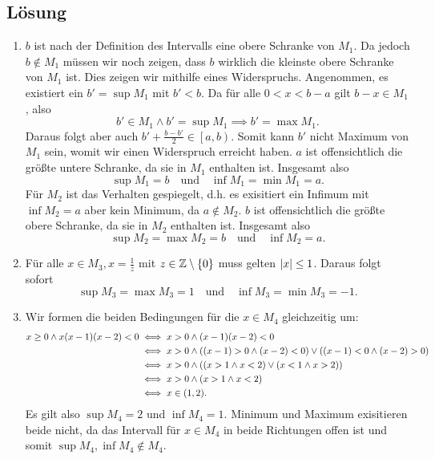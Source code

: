 \documentclass[german,12pt]{homework}
\newcommand{\ZZ}{\mathbb{Z}}
\DeclarePairedDelimiter{\absolute}{\lvert}{\rvert}
\DeclarePairedDelimiter{\enbrace}{(}{)}
\DeclarePairedDelimiter{\penbrace}{\{}{\}}
\begin{document}
    \subsection*{Lösung}
    \begin{enumerate}
        \item \(b\) ist nach der Definition des Intervalls eine obere Schranke von \(M_1\). Da jedoch \(b \not\in M_1\) müssen wir noch zeigen, dass \(b\) wirklich die kleinste obere Schranke von \(M_1\) ist. Dies zeigen wir mithilfe eines Widerspruchs. Angenommen, es existiert ein \(b' = \sup{M_1}\) mit \(b' < b\). Da für alle \(0 < x < b - a\) gilt \(b - x \in M_1\), also
        \[b' \in M_1 \land b' = \sup{M_1} \implies b' = \max{M_1}.\]
        Daraus folgt aber auch \(b' + \frac{b - b'}{2} \in \left[a, b\right)\). Somit kann \(b'\) nicht Maximum von \(M_1\) sein, womit wir einen Widerspruch erreicht haben. \(a\) ist offensichtlich die größte untere Schranke, da sie in \(M_1\) enthalten ist. Insgesamt also
        \[\sup{M_1} = b \quad \text{und} \quad \inf{M_1} = \min{M_1} = a.\]
        Für \(M_2\) ist das Verhalten gespiegelt, d.h. es exisitiert ein Infimum mit \(\inf{M_2} = a\) aber kein Minimum, da \(a \not\in M_2\). \(b\) ist offensichtlich die größte obere Schranke, da sie in \(M_2\) enthalten ist. Insgesamt also
        \[\sup{M_2} = \max{M_2} = b \quad \text{und} \quad \inf{M_2} = a.\]
        \item Für alle \(x \in M_3, x = \frac{1}{z}\) mit \(z \in \ZZ \setminus \penbrace*{0}\) muss gelten \(\absolute*{x} \le 1\). Daraus folgt sofort
        \[\sup{M_3} = \max{M_3} = 1 \quad \text{und} \quad \inf{M_3} = \min{M_3} = -1.\]
        \item Wir formen die beiden Bedingungen für die \(x \in M_4\) gleichzeitig um:
        \begin{align*}
            x \ge 0 \land x\enbrace*{x - 1}\enbrace*{x - 2} < 0 &\iff x > 0 \land \enbrace*{x - 1}\enbrace*{x - 2} < 0\\
            &\iff x > 0 \land \enbrace*{\enbrace*{x - 1} > 0 \land \enbrace*{x - 2} < 0} \lor \enbrace*{\enbrace*{x - 1} < 0 \land \enbrace*{x - 2} > 0}\\
            & \iff x > 0 \land \enbrace*{\enbrace*{x > 1 \land x < 2} \lor \enbrace*{x < 1 \land x > 2}}\\
            & \iff x > 0 \land \enbrace*{x > 1 \land x < 2}\\
            & \iff x \in \enbrace*{1, 2}.
        \end{align*}
        Es gilt also \(\sup{M_4} = 2\) und \(\inf{M_4} = 1\). Minimum und Maximum exisitieren beide nicht, da das Intervall für \(x \in M_4\) in beide Richtungen offen ist und somit \(\sup{M_4}, \inf{M_4} \not\in M_4\).
    \end{enumerate}
\end{document}

